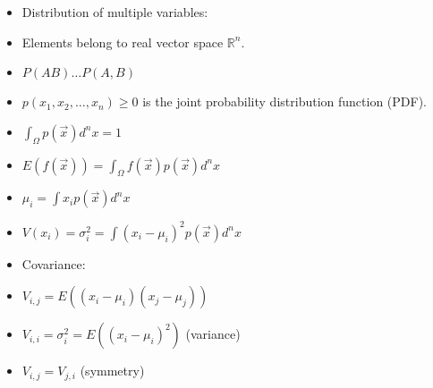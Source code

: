 \begin{itemize}
      \item Distribution of multiple variables:
      \item Elements belong to real vector space $\mathbb{R}^n$.
      \item $P(AB) \dots P(A,B)$
      \item $p(x_1, x_2, \ldots, x_n) \ge 0$ is the joint probability distribution function (PDF).
      \item $\int_{\Omega} p(\vec{x}) d^n x = 1$
      \item $E(f(\vec{x})) = \int_{\Omega} f(\vec{x}) p(\vec{x}) d^n x$
      \item $\mu_i = \int x_i p(\vec{x}) d^n x$
      \item $V(x_i) = \sigma_i^2 = \int (x_i - \mu_i)^2 p(\vec{x}) d^n x$
      \item Covariance:
      \item $V_{i,j} = E((x_i-\mu_i)(x_j-\mu_j))$
      \item $V_{i,i} = \sigma_i^2 = E((x_i-\mu_i)^2)$ (variance)
      \item $V_{i,j} = V_{j,i}$ (symmetry)
\end{itemize}

